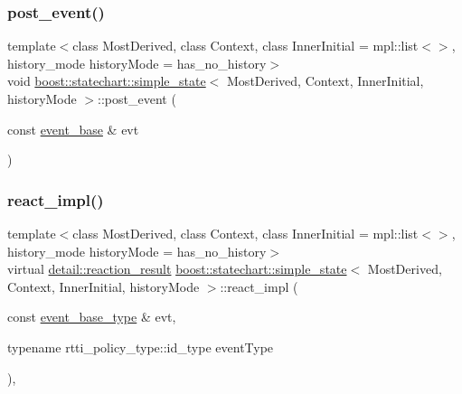 \mbox{\label{classboost_1_1statechart_1_1simple__state_aeea3396289a32b467dd094d2c7965f23}} 
\subsubsection{\texorpdfstring{post\+\_\+event()}{post\_event()}\hspace{0.1cm}{\footnotesize\ttfamily [2/2]}}
{\footnotesize\ttfamily template$<$class Most\+Derived, class Context, class Inner\+Initial = mpl\+::list$<$$>$, history\+\_\+mode history\+Mode = has\+\_\+no\+\_\+history$>$ \\
void \mbox{\hyperlink{classboost_1_1statechart_1_1simple__state}{boost\+::statechart\+::simple\+\_\+state}}$<$ Most\+Derived, Context, Inner\+Initial, history\+Mode $>$\+::post\+\_\+event (\begin{DoxyParamCaption}\item[{const \mbox{\hyperlink{classboost_1_1statechart_1_1event__base}{event\+\_\+base}} \&}]{evt }\end{DoxyParamCaption})\hspace{0.3cm}{\ttfamily [inline]}}

\mbox{\label{classboost_1_1statechart_1_1simple__state_aea845e975828260436775198e4c4e599}} 
\subsubsection{\texorpdfstring{react\+\_\+impl()}{react\_impl()}}
{\footnotesize\ttfamily template$<$class Most\+Derived, class Context, class Inner\+Initial = mpl\+::list$<$$>$, history\+\_\+mode history\+Mode = has\+\_\+no\+\_\+history$>$ \\
virtual \mbox{\hyperlink{namespaceboost_1_1statechart_1_1detail_ab091bbb4c29327fb46ee479ea1b7255b}{detail\+::reaction\+\_\+result}} \mbox{\hyperlink{classboost_1_1statechart_1_1simple__state}{boost\+::statechart\+::simple\+\_\+state}}$<$ Most\+Derived, Context, Inner\+Initial, history\+Mode $>$\+::react\+\_\+impl (\begin{DoxyParamCaption}\item[{const \mbox{\hyperlink{classboost_1_1statechart_1_1simple__state_a153e115715f5d828021a273ce282ba9b}{event\+\_\+base\+\_\+type}} \&}]{evt,  }\item[{typename rtti\+\_\+policy\+\_\+type\+::id\+\_\+type}]{event\+Type }\end{DoxyParamCaption})\hspace{0.3cm}{\ttfamily [inline]}, {\ttfamily [virtual]}}

